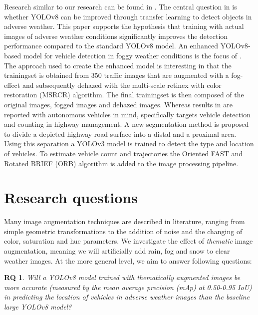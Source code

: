 \documentclass[]{article}
\newtheorem{researchquestion}{RQ}
\begin{document}
	Research similar to our research can be found in \cite{kumarObjectDetectionAdverse2023}. The central question in \cite{kumarObjectDetectionAdverse2023} is whether YOLO{\small v8} can be improved through transfer learning to detect objects in adverse weather. This paper supports the hypothesis that training with actual images of adverse weather conditions significantly improves the detection performance compared to the standard YOLO{\small v8} model. An enhanced YOLO\small{v8}-based model for vehicle detection in foggy weather conditions is the focus of \cite{liVehicleDetectionFoggy2022}. The approach used to create the enhanced model is interesting in that the trainingset is obtained from 350 traffic images that are augmented with a fog-effect and subsequently dehazed with the multi-scale retinex with color restoration (MSRCR) algorithm. The final trainingset is then composed of the original images, fogged images and dehazed images. Whereas results in \cite{liVehicleDetectionFoggy2022} are reported with autonomous vehicles in mind, \cite{songVisionbasedVehicleDetection2019} specifically targets vehicle detection and counting in highway management.  A new segmentation method is proposed to divide a depicted highway road surface into a distal and a proximal area. Using this separation a YOLO{\small v3} model is trained to detect the type and location of vehicles. To estimate vehicle count and trajectories the Oriented FAST and Rotated BRIEF (ORB) algorithm is added to the image processing pipeline.
	

\section{Research questions}

	Many image augmentation techniques are described in literature, ranging from simple geometric transformations to the addition of noise and the changing of color, saturation and hue parameters. We investigate the effect of \textit{thematic} image augmentation, meaning we will artificially add rain, fog and snow to clear weather images. At the more general level, we aim to answer following questions:

	\begin{researchquestion}
		\label{rq1}
		Will a YOLO{\small v8} model trained with thematically augmented images be more accurate (measured by the mean average precision (mAp) at 0.50-0.95 IoU) in predicting the location of vehicles in adverse weather images than the baseline large YOLO{\small v8} model?
	\end{researchquestion}
\end{document}
